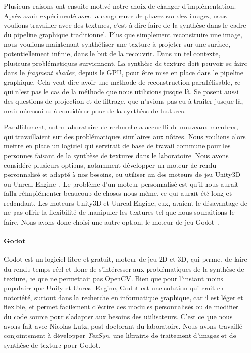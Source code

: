 \bigskip

Plusieurs raisons ont ensuite motivé notre choix de changer d'implémentation. Après avoir expérimenté avec la congruence de phases sur des images, nous voulions travailler avec des textures, c'est à dire faire de la synthèse dans le cadre du pipeline graphique traditionnel. Plus que simplement reconstruire une image, nous voulions maintenant synthétiser une texture à projeter sur une surface, potentiellement infinie, dans le but de la recouvrir. Dans un tel contexte, plusieurs problématiques surviennent. La synthèse de texture doit pouvoir se faire dans le \textit{fragment shader}, depuis le GPU, pour être mise en place dans le pipeline graphique. Cela veut dire avoir une méthode de reconstruction parallélisable, ce qui n'est pas le cas de la méthode que nous utilisions jusque là. Se posent aussi des questions de projection et de filtrage, que n'avions pas eu à traiter jusque là, mais nécessaires à considérer pour de la synthèse de textures.

\bigskip

Parallèlement, notre laboratoire de recherche a accueilli de nouveaux membres, qui travaillaient sur des problématiques similaires aux nôtres. Nous voulions alors mettre en place un logiciel qui servirait de base de travail commune pour les personnes faisant de la synthèse de textures dans le laboratoire. Nous avons considéré plusieurs options, notamment développer un moteur de rendu personnalisé et adapté à nos besoins, ou utiliser un des moteurs de jeu Unity3D~\cite{unity_engine} ou Unreal Engine~\cite{unreal_engine}. Le problème d'un moteur personnalisé est qu'il nous aurait fallu réimplémenter beaucoup de choses nous-même, ce qui aurait été long et redondant. Les moteurs Unity3D et Unreal Engine, eux, avaient le désavantage de ne pas offrir la flexibilité de manipuler les textures tel que nous souhaitions le faire. Nous avons donc choisi une autre option, le moteur de jeu Godot~\cite{godot_game_engine}.

\paragraph{Godot}

Godot est un logiciel libre et gratuit, moteur de jeu 2D et 3D, qui permet de faire du rendu temps-réel et donc de s'intéresser aux problématiques de la synthèse de texture, ce que ne permettait pas OpenCV. Bien que pour l'instant moins populaire que Unity et Unreal Engine, Godot est une solution qui croit en notoriété, surtout dans la recherche en informatique graphique, car il est léger et flexible, et permet facilement d'écrire des modules personnalisés ou de modifier du code source pour s'adapter aux besoins des utilisateurs. C'est ce que nous avons fait avec Nicolas Lutz, post-doctorant du laboratoire. Nous avons travaillé conjointement à développer \textit{TexSyn}, une librairie \cpp de traitement d'images et de synthèse de texture pour Godot.

